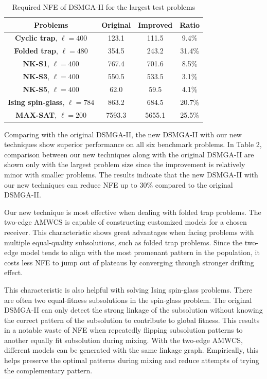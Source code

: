 \documentclass{sig-alternate-05-2015}
\begin{document}
\begin{table}[ht]
\centering
\begin{tabular}{ |c|c|c|c| } \hline
\textbf{Problems}& \textbf{Original} & \textbf{Improved} & \textbf{Ratio}\\ \hline
\textbf{Cyclic trap}, $\ell = 400$ 		& 123.1&111.5&9.4\%\\ \hline
\textbf{Folded trap}, $\ell = 480$	 	& 354.5& 243.2&31.4\%\\ \hline
\textbf{NK-S1}, $\ell = 400$ 				& 767.4& 701.6&8.5\%\\ \hline
\textbf{NK-S3}, $\ell = 400$ 				& 550.5& 533.5&3.1\%\\ \hline
\textbf{NK-S5}, $\ell = 400$ 				& 62.0& 59.5&4.1\%\\ \hline
\textbf{Ising spin-glass}, $\ell = 784$ 	& 863.2&684.5&20.7\%\\ \hline
\textbf{MAX-SAT}, $\ell = 200$ 			& 7593.3& 5655.1&25.5\%\\ \hline
\end{tabular}
\caption{Required NFE of DSMGA-II for the largest test problems}
\end{table}

Comparing with the original DSMGA-II, the new DSMGA-II with our new techniques show superior performance on all six benchmark problems.
In Table 2, comparison between our new techniques along with the original DSMGA-II are shown only with the largest problem size since the improvement is relatively minor with smaller problems. 
The results indicate that the new DSMGA-II with our new techniques can reduce NFE up to 30\% compared to the original DSMGA-II. 


Our new technique is most effective when dealing with folded trap problems.
The two-edge AMWCS is capable of constructing customized models for a chosen receiver. 
This characteristic shows great advantages when facing problems with multiple equal-quality subsolutions, such as folded trap problems.
Since the two-edge model tends to align with the most promenant pattern in the population, it costs less NFE to jump out of plateaus by converging through stronger drifting effect.


This characteristic is also helpful with solving Ising spin-glass problems. 
There are often two equal-fitness subsolutions in the spin-glass problem.
The original DSMGA-II can only detect the strong linkage of the subsolution without knowing the correct pattern of the subsolution to contribute to global fitness.
This results in a notable waste of NFE when repeatedly flipping subsolution patterns to another equally fit subsolution during mixing.
With the two-edge AMWCS, different models can be generated with the same linkage graph. 
Empirically, this helps preserve the optimal patterns during mixing and reduce attempts of trying the complementary pattern.
\end{document}
